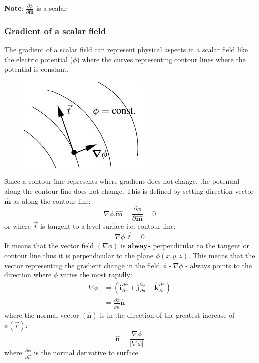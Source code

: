 \documentclass[10pt,a4paper]{article}
\begin{document}
\textbf{Note}: $\frac{\partial \phi}{\partial \hat{\textbf{m}}}$ is a scalar

\subsubsection{Gradient of a scalar field}

The gradient of a scalar field can represent physical aspects in a scalar field like the
electric potential ($\phi$) where the curves representing contour lines where the
potential is constant.

\begin{figure} [h!]
    \centering
    \includegraphics[scale=0.75]{Electric_field.JPG}
\end{figure}

Since a contour line represents where gradient does not change, the potential along the contour line
does not change. This is defined by setting direction vector $\hat{\textbf{m}}$ as along the contour
line:
$$
    \nabla\phi.\hat{\textbf{m}}=\frac{\partial \phi}{\partial \hat{\textbf{m}}}= 0
$$
or where $\overrightarrow{t}$ is tangent to a level surface i.e. contour line:
$$
    \nabla\phi.\overrightarrow{t} = 0
$$
It means that the vector field $(\nabla\phi)$ is \textbf{always} perpendicular to the tangent or
contour line thus it is perpendicular to the plane $\phi(x,y,z)$. This means that the vector
representing the gradient change in the field $\phi$ - $\nabla\phi$ - always points to the direction where $\phi$ varies the most rapidly:
\begin{align*}
    \nabla\phi &= \left(\hat{\textbf{i}}\frac{\partial \phi}{\partial x}+\hat{\textbf{j}}\frac{\partial \phi}{\partial y} + \hat{\textbf{k}}\frac{\partial \phi}{\partial z}\right) \\
    &= \frac{\partial\phi}{\partial\overrightarrow{n}}\hat{\textbf{n}}
\end{align*}
where the normal vector $(\hat{\textbf{n}})$ is in the direction of the greatest increase of $\phi(\overrightarrow{r})$:
$$
    \hat{\textbf{n}} = \frac{\nabla \phi}{|\nabla\phi|}
$$
where $\frac{\partial \phi}{\partial \overrightarrow{n}}$ is the normal derivative to surface
\end{document}
